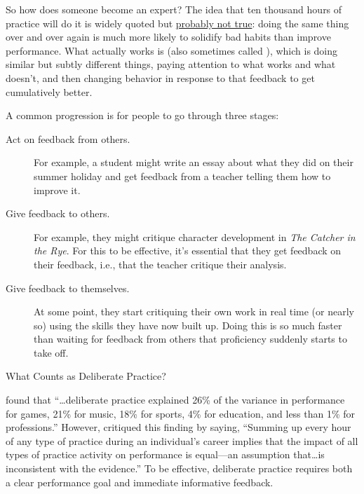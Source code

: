 So how does someone become an expert?  The idea that ten thousand
hours of practice will do it is widely quoted but
\href{http://www.goodlifeproject.com/podcast/anders-ericsson/}{probably
  not true}: doing the same thing over and over again is much more
likely to solidify bad habits than improve performance. What actually
works is  (also
sometimes called ), which is doing similar but subtly different things,
paying attention to what works and what doesn't, and then changing
behavior in response to that feedback to get cumulatively better.

A common progression is for people to go through three stages:

\begin{description}

  \item[Act on feedback from others.]  For example, a student might
    write an essay about what they did on their summer holiday and get
    feedback from a teacher telling them how to improve it.

  \item[Give feedback to others.] For example, they might critique
    character development in \emph{The Catcher in the Rye}.  For this
    to be effective, it's essential that they get feedback on their
    feedback, i.e., that the teacher critique their analysis.

  \item[Give feedback to themselves.]  At some point, they start
    critiquing their own work in real time (or nearly so) using the
    skills they have now built up. Doing this is so much faster than
    waiting for feedback from others that proficiency suddenly starts
    to take off.

\end{description}

\begin{callout}{What Counts as Deliberate Practice?}

  \cite{Macn2014} found that ``{\ldots}deliberate practice explained
  26\% of the variance in performance for games, 21\% for music, 18\%
  for sports, 4\% for education, and less than 1\% for professions.''
  However, \cite{Eric2016} critiqued this finding by saying, ``Summing
  up every hour of any type of practice during an individual's career
  implies that the impact of all types of practice activity on
  performance is equal---an assumption that{\ldots}is inconsistent with
  the evidence.''  To be effective, deliberate practice requires both
  a clear performance goal and immediate informative feedback.

\end{callout}

